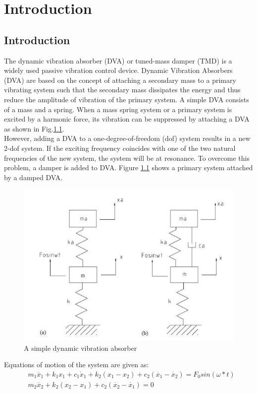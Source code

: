 %
\chapter{Introduction}
\section{Introduction}
The dynamic vibration absorber (DVA) or tuned-mass damper (TMD) is a widely used passive vibration control device. Dynamic Vibration Absorbers (DVA) are based on the concept of attaching a secondary mass to a primary vibrating system such that the secondary mass dissipates the energy and thus reduce the amplitude of vibration of the primary system. A simple DVA consists of a mass and a spring. When a mass spring system or a primary system is excited by a harmonic force, its vibration can be suppressed by attaching a DVA as shown in Fig.\ref{dva}.\\
However, adding a DVA to a one-degree-of-freedom (dof) system results in a new 2-dof system. If the exciting frequency coincides with one of the two natural frequencies of the new system, the system will be at resonance. To overcome this problem, a damper is added to DVA. Figure \ref{dva} shows a primary system attached by a damped DVA.

\begin{figure}[h]
\centering
\includegraphics[scale=0.4]{"figures/dva"}
\caption{A simple dynamic vibration absorber}
\label{dva}
\end{figure}
Equations of motion of the system are given as:
\begin{align*}
&m_1\ddot{x_1}+k_1x_1+c_1 \dot x_1 +k_2(x_1-x_2)+c_2(\dot{x_1}-\dot{x_2})=F_0sin(\omega *t) \\
&m_2\ddot{x_2}+k_2(x_2-x_1)+c_{2}(\dot{x_{2}}-\dot{x_{1}})=0
\end{align*}

